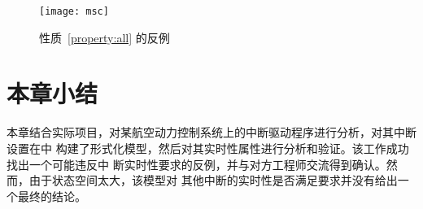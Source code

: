 \begin{figure}[H]
	\centering
	\texttt{[image: msc]}
	\caption{性质~\ref{property:all} 的反例}
	\label{fig:exp_counter}
\end{figure}

\section{本章小结}
\label{sec:sum_4}

本章结合实际项目，对某航空动力控制系统上的中断驱动程序进行分析，对其中断设置在\uppaal 中
构建了形式化模型，然后对其实时性属性进行分析和验证。该工作成功找出一个可能违反中
断实时性要求的反例，并与对方工程师交流得到确认。然而，由于状态空间太大，该模型对
其他中断的实时性是否满足要求并没有给出一个最终的结论。